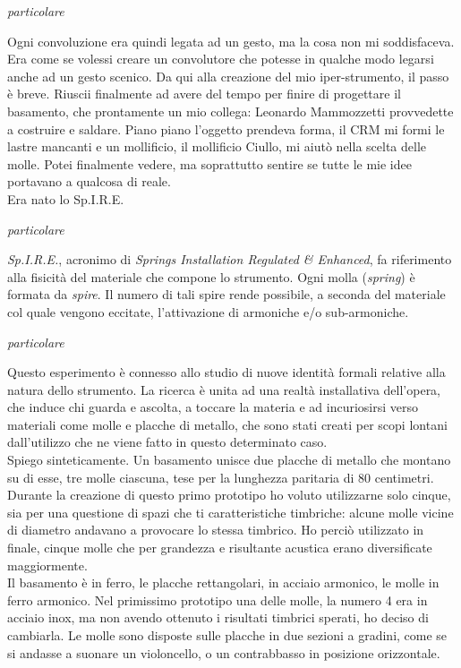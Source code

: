 \begin{floatingfigure}{10cm}
\mbox{}
\small{\caption{\textit{particolare}}}
\end{floatingfigure}
Ogni convoluzione era quindi legata ad un gesto, ma la cosa non mi soddisfaceva. Era come se volessi creare un convolutore che potesse in qualche modo legarsi anche ad un gesto scenico. Da qui alla creazione del mio iper-strumento, il passo è breve. Riuscii finalmente ad avere del tempo per finire di progettare il basamento, che prontamente un mio collega: Leonardo Mammozzetti provvedette a costruire e saldare. Piano piano l'oggetto prendeva forma, il CRM mi formi le lastre mancanti e un mollificio, il mollificio Ciullo, mi aiutò nella scelta delle molle. Potei finalmente vedere, ma soprattutto sentire se tutte le mie idee portavano a qualcosa di reale. \\
Era nato lo Sp.I.R.E. \\
\begin{floatingfigure}{10cm}
\mbox{}
\small{\caption{\textit{particolare}}}
\end{floatingfigure}
\textit{Sp.I.R.E.}, acronimo di \textit{Springs Installation Regulated \& Enhanced}, fa riferimento alla fisicità del materiale che compone lo strumento. Ogni molla (\textit{spring}) è formata da \textit{spire}. Il numero di tali spire rende possibile, a seconda del materiale col quale vengono eccitate, l'attivazione di armoniche e/o sub-armoniche. \\
\begin{floatingfigure}{10cm}
\mbox{}
\small{\caption{\textit{particolare}}}
\end{floatingfigure}
Questo esperimento è connesso allo studio di nuove identità formali relative alla natura dello strumento.  La ricerca è unita ad una realtà installativa dell'opera, che induce chi guarda e ascolta, a toccare la materia e ad incuriosirsi verso materiali come molle e placche di metallo, che sono stati creati per scopi lontani dall'utilizzo che ne viene fatto in questo determinato caso. \\
Spiego sinteticamente. Un basamento unisce due placche di metallo che montano su di esse, tre molle ciascuna, tese per la lunghezza paritaria di 80 centimetri. Durante la creazione di questo primo prototipo ho voluto utilizzarne solo cinque, sia per una questione di spazi che ti caratteristiche timbriche: alcune molle vicine di diametro andavano a provocare lo stessa timbrico. Ho perciò utilizzato in finale, cinque molle che per grandezza e risultante acustica erano diversificate maggiormente.\\ Il basamento è in ferro, le placche rettangolari, in acciaio armonico, le molle in ferro armonico. Nel primissimo prototipo una delle molle, la numero 4 era in acciaio inox, ma non avendo ottenuto i risultati timbrici sperati, ho deciso di cambiarla. Le molle sono disposte sulle placche in due sezioni a gradini, come se si andasse a suonare un violoncello, o un contrabbasso in posizione orizzontale. \\
